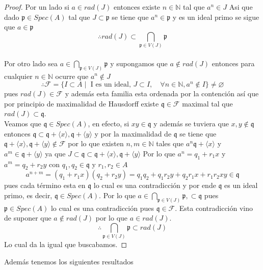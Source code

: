 \documentclass[14pt]{extarticle}
\begin{document}
\begin{proof}
    Por un lado si $a \in rad(J)$ entonces existe $n\in \mathbb{N}$
    tal que $a^n \in J$ Asi que dado $\mathfrak{p}\in Spec(A)$ tal que
    $J \subset \mathfrak{p}$ se tiene que $a^n \in \mathfrak{p}$ y 
    es un ideal primo se sigue que $a \in \mathfrak{p}$
    $$\therefore rad(J)\subset \bigcap_{\mathfrak{p} \in V(J)} \mathfrak{p}$$
    \\
    Por otro lado sea $a\in \bigcap_{\mathfrak{p} \in V(J)} \mathfrak{p}$ y
    supongamos que $a \notin rad(J)$ entonces para cualquier $n \in \mathbb{N}$
    ocurre que $a^n \notin J$ 
    $$\therefore \mathcal{F} = \{I\subset A \mid 
    \mbox{ I es un ideal, } J\subset I, \quad 
    \forall n\in \mathbb{N}, a^n \notin I\} \neq \varnothing$$
    pues $rad(J) \in \mathcal{F}$ y además esta familia 
    esta ordenada por la contención así que por principio 
    de maximalidad de Hausdorff existe $\mathfrak{q} \in \mathcal{F}$
    maximal tal que $rad(J) \subset \mathfrak{q}$.\\
    Veamos que $\mathfrak{q} \in Spec(A)$, en efecto,
    si $xy \in \mathfrak{q}$ y además se tuviera que $x,y\notin\mathfrak{q}$
    entonces $\mathfrak{q}\subset \mathfrak{q}+ \langle x \rangle, \mathfrak{q}+ \langle y \rangle$
    y por la maximalidad de $\mathfrak{q}$ se tiene que 
    $\mathfrak{q}+ \langle x \rangle, \mathfrak{q}+ \langle y \rangle \notin \mathcal{F}$
    por lo que existen $n, m \in \mathbb{N}$ tales que 
    $a^n \mathfrak{q}+ \langle x \rangle$ y $a^m \in\mathfrak{q}+ \langle y \rangle$
    ya que $J \subset \mathfrak{q} \subset \mathfrak{q}+ \langle x \rangle, \mathfrak{q}+ \langle y \rangle$
    Por lo que $a^n = q_1 + r_1x$ y $a^m = q_2 + r_2 y$ con $q_1, q_2 \in \mathfrak{q}$
    y $r_1, r_2 \in A$
    $$a^{n+m} = (q_1+r_1x)(q_2+r_2y) = q_1q_2 + q_1r_2y + q_2r_1x + r_1r_2xy \in \mathfrak{q}$$
    pues cada término esta en $\mathfrak{q}$
    lo cual es una contradicción y por ende $\mathfrak{q}$ es un ideal 
    primo, es decir, $\mathfrak{q} \in Spec(A)$.
    Por lo que $a \in \bigcap_{\mathfrak{p} \in V(J)} \mathfrak{p},
    \subset \mathfrak{q}$  pues $\mathfrak{p} \in Spec(A)$
    lo cual es una contradicción pues $\mathfrak{q}\in \mathcal{F}$.
    Esta contradicción vino de suponer que $a\notin rad(J)$ por lo que 
    $a \in rad(J)$.
    $$\therefore \bigcap_{\mathfrak{p} \in V(J)} \mathfrak{p} \subset rad(J)$$
    Lo cual da la igual que buscabamos.
\end{proof}

Además tenemos los siguientes resultados
\end{document}
